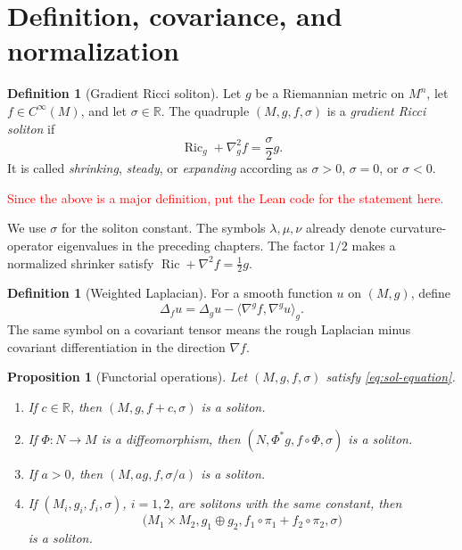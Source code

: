 \documentclass[10pt]{coll-l}
\newtheorem{proposition}[theorem]{Proposition}
\theoremstyle{definition}
\newtheorem{definition}[theorem]{Definition}
\theoremstyle{remark}
\numberwithin{section}{chapter}
\numberwithin{equation}{chapter}
\newcommand{\Ric}{\operatorname{Ric}}
\begin{document}
\section{Definition, covariance, and normalization}
\label{sec:sol-definition}

\begin{definition}[Gradient Ricci soliton]
\label{def:gradient-ricci-soliton}
Let $g$ be a Riemannian metric on $M^n$, let $f\in C^\infty(M)$, and let
$\sigma\in\mathbb R$.  The quadruple $(M,g,f,\sigma)$ is a
\emph{gradient Ricci soliton} if
\begin{equation}
          \Ric_g+\nabla_g^2f=\frac{\sigma}{2}g.            \label{eq:sol-equation}
\end{equation}
It is called \emph{shrinking}, \emph{steady}, or \emph{expanding} according
as $\sigma>0$, $\sigma=0$, or $\sigma<0$.
\end{definition}

\textcolor{red}{Since the above is a major definition, put the Lean code for the statement here.}

We use $\sigma$ for the soliton constant.  The symbols
$\lambda,\mu,\nu$ already denote curvature-operator eigenvalues in the
preceding chapters.  The factor
$1/2$ makes a normalized shrinker satisfy
$\Ric+\nabla^2f=\frac12g$.

\begin{definition}[Weighted Laplacian]
\label{def:sol-weighted-laplacian}
For a smooth function $u$ on $(M,g)$, define
\begin{equation}
       \Delta_f u
          =\Delta_gu-\langle\nabla^gf,\nabla^gu\rangle_g. \label{eq:sol-weighted-laplacian}
\end{equation}
The same symbol on a covariant tensor means the rough Laplacian minus
covariant differentiation in the direction $\nabla f$.
\end{definition}

\begin{proposition}[Functorial operations]
\label{prop:sol-operations}
Let $(M,g,f,\sigma)$ satisfy \eqref{eq:sol-equation}.
\begin{enumerate}
\item If $c\in\mathbb R$, then $(M,g,f+c,\sigma)$ is a soliton.
\item If $\Phi:N\to M$ is a diffeomorphism, then
      $(N,\Phi^*g,f\circ\Phi,\sigma)$ is a soliton.
\item If $a>0$, then $(M,ag,f,\sigma/a)$ is a soliton.
\item If $(M_i,g_i,f_i,\sigma)$, $i=1,2$, are solitons with the same
      constant, then
      \[
       \bigl(M_1\times M_2,
          g_1\oplus g_2,
          f_1\circ\pi_1+f_2\circ\pi_2,
          \sigma\bigr)
      \]
      is a soliton.
\end{enumerate}
\end{proposition}
\end{document}
